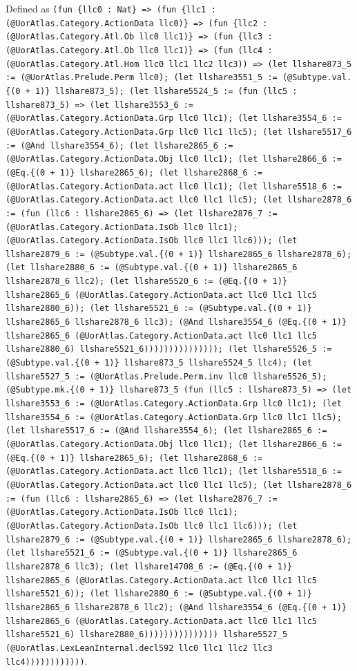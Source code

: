 \documentclass[11pt]{article}
\begin{document}
\noindent Defined as \texttt{(fun \{llc0 : Nat\} => (fun \{llc1 : (@UorAtlas.Category.ActionData llc0)\} => (fun \{llc2 : (@UorAtlas.Category.Atl.Ob llc0 llc1)\} => (fun \{llc3 : (@UorAtlas.Category.Atl.Ob llc0 llc1)\} => (fun (llc4 : (@UorAtlas.Category.Atl.Hom llc0 llc1 llc2 llc3)) => (let llshare873\_5 := (@UorAtlas.Prelude.Perm llc0); (let llshare3551\_5 := (@Subtype.val.\{(0 + 1)\} llshare873\_5); (let llshare5524\_5 := (fun (llc5 : llshare873\_5) => (let llshare3553\_6 := (@UorAtlas.Category.ActionData.Grp llc0 llc1); (let llshare3554\_6 := (@UorAtlas.Category.ActionData.Grp llc0 llc1 llc5); (let llshare5517\_6 := (@And llshare3554\_6); (let llshare2865\_6 := (@UorAtlas.Category.ActionData.Obj llc0 llc1); (let llshare2866\_6 := (@Eq.\{(0 + 1)\} llshare2865\_6); (let llshare2868\_6 := (@UorAtlas.Category.ActionData.act llc0 llc1); (let llshare5518\_6 := (@UorAtlas.Category.ActionData.act llc0 llc1 llc5); (let llshare2878\_6 := (fun (llc6 : llshare2865\_6) => (let llshare2876\_7 := (@UorAtlas.Category.ActionData.IsOb llc0 llc1); (@UorAtlas.Category.ActionData.IsOb llc0 llc1 llc6))); (let llshare2879\_6 := (@Subtype.val.\{(0 + 1)\} llshare2865\_6 llshare2878\_6); (let llshare2880\_6 := (@Subtype.val.\{(0 + 1)\} llshare2865\_6 llshare2878\_6 llc2); (let llshare5520\_6 := (@Eq.\{(0 + 1)\} llshare2865\_6 (@UorAtlas.Category.ActionData.act llc0 llc1 llc5 llshare2880\_6)); (let llshare5521\_6 := (@Subtype.val.\{(0 + 1)\} llshare2865\_6 llshare2878\_6 llc3); (@And llshare3554\_6 (@Eq.\{(0 + 1)\} llshare2865\_6 (@UorAtlas.Category.ActionData.act llc0 llc1 llc5 llshare2880\_6) llshare5521\_6))))))))))))))); (let llshare5526\_5 := (@Subtype.val.\{(0 + 1)\} llshare873\_5 llshare5524\_5 llc4); (let llshare5527\_5 := (@UorAtlas.Prelude.Perm.inv llc0 llshare5526\_5); (@Subtype.mk.\{(0 + 1)\} llshare873\_5 (fun (llc5 : llshare873\_5) => (let llshare3553\_6 := (@UorAtlas.Category.ActionData.Grp llc0 llc1); (let llshare3554\_6 := (@UorAtlas.Category.ActionData.Grp llc0 llc1 llc5); (let llshare5517\_6 := (@And llshare3554\_6); (let llshare2865\_6 := (@UorAtlas.Category.ActionData.Obj llc0 llc1); (let llshare2866\_6 := (@Eq.\{(0 + 1)\} llshare2865\_6); (let llshare2868\_6 := (@UorAtlas.Category.ActionData.act llc0 llc1); (let llshare5518\_6 := (@UorAtlas.Category.ActionData.act llc0 llc1 llc5); (let llshare2878\_6 := (fun (llc6 : llshare2865\_6) => (let llshare2876\_7 := (@UorAtlas.Category.ActionData.IsOb llc0 llc1); (@UorAtlas.Category.ActionData.IsOb llc0 llc1 llc6))); (let llshare2879\_6 := (@Subtype.val.\{(0 + 1)\} llshare2865\_6 llshare2878\_6); (let llshare5521\_6 := (@Subtype.val.\{(0 + 1)\} llshare2865\_6 llshare2878\_6 llc3); (let llshare14708\_6 := (@Eq.\{(0 + 1)\} llshare2865\_6 (@UorAtlas.Category.ActionData.act llc0 llc1 llc5 llshare5521\_6)); (let llshare2880\_6 := (@Subtype.val.\{(0 + 1)\} llshare2865\_6 llshare2878\_6 llc2); (@And llshare3554\_6 (@Eq.\{(0 + 1)\} llshare2865\_6 (@UorAtlas.Category.ActionData.act llc0 llc1 llc5 llshare5521\_6) llshare2880\_6))))))))))))))) llshare5527\_5 (@UorAtlas.LexLeanInternal.decl592 llc0 llc1 llc2 llc3 llc4))))))))))))}.\par
\end{document}
